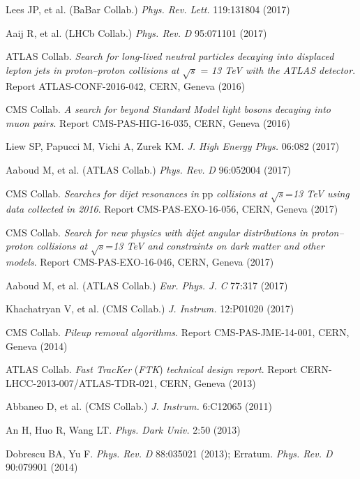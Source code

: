 \documentclass{ar-1col}
\begin{document}
\begin{thebibliography}{175}
{Lees JP, et al. (BaBar Collab}.) \textit{Phys. Rev. Lett.} 119:131804 (2017)

{Aaij R, et al. (LHCb Collab}.) \textit{Phys. Rev.} \textit{D} 95:071101 (2017)

ATLAS Collab. \textit{Search for long-lived neutral particles decaying into displaced lepton jets in proton--proton collisions at} $\sqrt{s}$ = \textit{13 TeV with the ATLAS detector}. Report ATLAS-CONF-2016-042, CERN, Geneva (2016)

CMS Collab. \textit{A search for beyond Standard Model light bosons decaying into muon pairs}.
Report CMS-PAS-HIG-16-035, CERN, Geneva (2016)

Liew SP, Papucci M, Vichi A, Zurek KM. \textit{J. High Energy Phys.} 06:082 (2017)

Aaboud M, et al. ({ATLAS Collab}.) \textit{Phys. Rev.} \textit{D} 96:052004 (2017)

CMS Collab. \textit{Searches for dijet resonances in} pp\textit{ collisions at} $\sqrt{s}$=\textit{13 TeV using data collected in 2016}. Report CMS-PAS-EXO-16-056, CERN, Geneva (2017)

CMS Collab.\textit{ Search for new physics with dijet angular distributions in proton--proton collisions at} $\sqrt{s}$=\textit{13 TeV and constraints on dark matter and other models}. Report CMS-PAS-EXO-16-046, CERN, Geneva (2017)

Aaboud M, et al. ({ATLAS Collab}.) \textit{Eur. Phys. J.} \textit{C} 77:317 (2017)

{Khachatryan V, et al. (CMS Collab}.) \textit{J. Instrum.} 12:P01020 (2017)

CMS Collab. \textit{Pileup removal algorithms}. Report CMS-PAS-JME-14-001, CERN, Geneva (2014)

ATLAS Collab. \textit{Fast TracKer} (\textit{FTK}) \textit{technical design report}. Report CERN-LHCC-2013-007/ATLAS-TDR-021, CERN, Geneva
(2013)

{Abbaneo D, et al. (CMS Collab}.) \textit{J. Instrum.} 6:C12065 (2011)

An H, Huo R, Wang LT. \textit{Phys. Dark Univ.} 2:50 (2013)

Dobrescu BA, Yu F. \textit{Phys. Rev.} \textit{D} 88:035021 (2013); Erratum. \textit{Phys. Rev. D} 90:079901 (2014)


\end{thebibliography}
\end{document}
